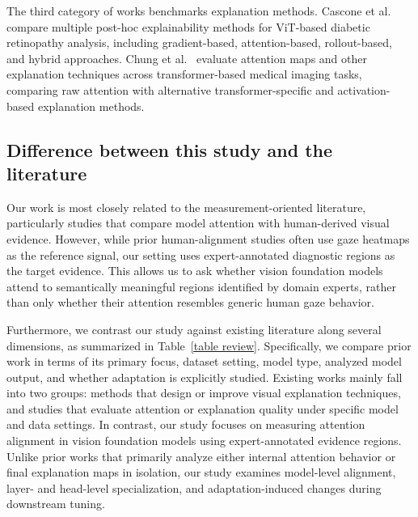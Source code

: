 \documentclass[lineno,pdflatex,sn-mathphys-num]{sn-jnl}%
\theoremstyle{thmstyleone}%
\theoremstyle{thmstyletwo}%
\theoremstyle{thmstylethree}%
\begin{document}
The third category of works benchmarks explanation methods. Cascone et al.~\cite{Cascone2026947} compare multiple post-hoc explainability methods for ViT-based diabetic retinopathy analysis, including gradient-based, attention-based, rollout-based, and hybrid approaches. Chung et al.~\cite{Chung2025110} evaluate attention maps and other explanation techniques across transformer-based medical imaging tasks, comparing raw attention with alternative transformer-specific and activation-based explanation methods.

\subsection{Difference between this study and the literature}

Our work is most closely related to the measurement-oriented literature, particularly studies that compare model attention with human-derived visual evidence. However, while prior human-alignment studies often use gaze heatmaps as the reference signal, our setting uses expert-annotated diagnostic regions as the target evidence. This allows us to ask whether vision foundation models attend to semantically meaningful regions identified by domain experts, rather than only whether their attention resembles generic human gaze behavior.

Furthermore, we contrast our study against existing literature along several dimensions, as summarized in Table~\ref{table review}. Specifically, we compare prior work in terms of its primary focus, dataset setting, model type, analyzed model output, and whether adaptation is explicitly studied. Existing works mainly fall into two groups: methods that design or improve visual explanation techniques, and studies that evaluate attention or explanation quality under specific model and data settings. In contrast, our study focuses on measuring attention alignment in vision foundation models using expert-annotated evidence regions. Unlike prior works that primarily analyze either internal attention behavior or final explanation maps in isolation, our study examines model-level alignment, layer- and head-level specialization, and adaptation-induced changes during downstream tuning.
\end{document}
